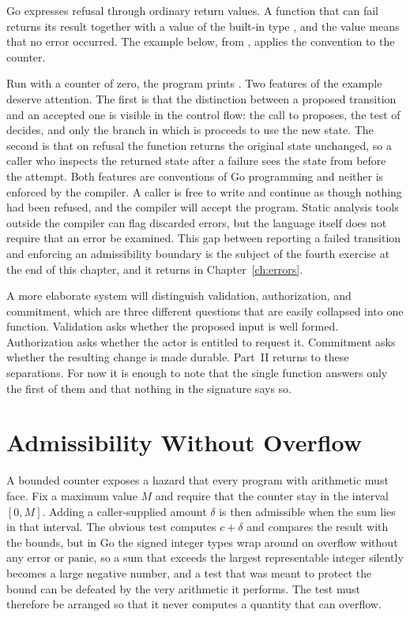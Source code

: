 Go expresses refusal through ordinary return values. A function that can fail returns its result together with a value of the built-in type , and the value  means that no error occurred. The example below, from , applies the convention to the counter.


Run with a counter of zero, the program prints . Two features of the example deserve attention. The first is that the distinction between a proposed transition and an accepted one is visible in the control flow: the call to  proposes, the test of  decides, and only the branch in which  is  proceeds to use the new state. The second is that on refusal the function returns the original state unchanged, so a caller who inspects the returned state after a failure sees the state from before the attempt. Both features are conventions of Go programming and neither is enforced by the compiler. A caller is free to write  and continue as though nothing had been refused, and the compiler will accept the program. Static analysis tools outside the compiler can flag discarded errors, but the language itself does not require that an error be examined. This gap between reporting a failed transition and enforcing an admissibility boundary is the subject of the fourth exercise at the end of this chapter, and it returns in Chapter~\ref{ch:errors}.

A more elaborate system will distinguish validation, authorization, and commitment, which are three different questions that are easily collapsed into one function. Validation asks whether the proposed input is well formed. Authorization asks whether the actor is entitled to request it. Commitment asks whether the resulting change is made durable. Part~II returns to these separations. For now it is enough to note that the single function  answers only the first of them and that nothing in the signature says so.

\section{Admissibility Without Overflow}

A bounded counter exposes a hazard that every program with arithmetic must face. Fix a maximum value $M$ and require that the counter stay in the interval $[0, M]$. Adding a caller-supplied amount $\delta$ is then admissible when the sum lies in that interval. The obvious test computes $c+\delta$ and compares the result with the bounds, but in Go the signed integer types wrap around on overflow without any error or panic, so a sum that exceeds the largest representable integer silently becomes a large negative number, and a test that was meant to protect the bound can be defeated by the very arithmetic it performs. The test must therefore be arranged so that it never computes a quantity that can overflow.

